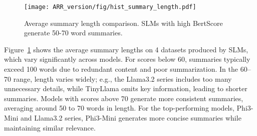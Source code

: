 \begin{figure}
    \centering
    \texttt{[image: ARR\_version/fig/hist\_summary\_length.pdf]}
    \caption{Average summary length comparison. SLMs with high BertScore generate 50-70 word summaries.}
    \label{fig:summary_length}
\end{figure}




Figure~\ref{fig:summary_length} shows the average summary lengths on 4 datasets produced by SLMs, which vary significantly across models. For scores below 60, summaries typically exceed 100 words due to redundant content and poor summarization. In the 60–70 range, length varies widely; e.g., the Llama3.2 series includes too many unnecessary details, while TinyLlama omits key information, leading to shorter summaries. Models with scores above 70 generate more consistent summaries, averaging around 50 to 70 words in length. For the top-performing models, Phi3-Mini and Llama3.2 series, Phi3-Mini generates more concise summaries while maintaining similar relevance.




